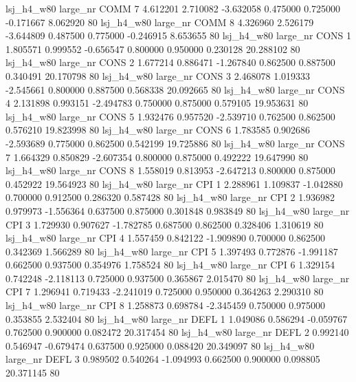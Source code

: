   lsj_h4_w80   large_nr     COMM                 7  4.612201  2.710082  -3.632058 0.475000 0.725000 -0.171667    8.062920 80
  lsj_h4_w80   large_nr     COMM                 8  4.326960  2.526179  -3.644809 0.487500 0.775000 -0.246915    8.653655 80
  lsj_h4_w80   large_nr     CONS                 1  1.805571  0.999552  -0.656547 0.800000 0.950000  0.230128   20.288102 80
  lsj_h4_w80   large_nr     CONS                 2  1.677214  0.886471  -1.267840 0.862500 0.887500  0.340491   20.170798 80
  lsj_h4_w80   large_nr     CONS                 3  2.468078  1.019333  -2.545661 0.800000 0.887500  0.568338   20.092665 80
  lsj_h4_w80   large_nr     CONS                 4  2.131898  0.993151  -2.494783 0.750000 0.875000  0.579105   19.953631 80
  lsj_h4_w80   large_nr     CONS                 5  1.932476  0.957520  -2.539710 0.762500 0.862500  0.576210   19.823998 80
  lsj_h4_w80   large_nr     CONS                 6  1.783585  0.902686  -2.593689 0.775000 0.862500  0.542199   19.725886 80
  lsj_h4_w80   large_nr     CONS                 7  1.664329  0.850829  -2.607354 0.800000 0.875000  0.492222   19.647990 80
  lsj_h4_w80   large_nr     CONS                 8  1.558019  0.813953  -2.647213 0.800000 0.875000  0.452922   19.564923 80
  lsj_h4_w80   large_nr      CPI                 1  2.288961  1.109837  -1.042880 0.700000 0.912500  0.286320    0.587428 80
  lsj_h4_w80   large_nr      CPI                 2  1.936982  0.979973  -1.556364 0.637500 0.875000  0.301848    0.983849 80
  lsj_h4_w80   large_nr      CPI                 3  1.729930  0.907627  -1.782785 0.687500 0.862500  0.328406    1.310619 80
  lsj_h4_w80   large_nr      CPI                 4  1.557459  0.842122  -1.909890 0.700000 0.862500  0.342369    1.566289 80
  lsj_h4_w80   large_nr      CPI                 5  1.397493  0.772876  -1.991187 0.662500 0.937500  0.354976    1.758524 80
  lsj_h4_w80   large_nr      CPI                 6  1.329154  0.742248  -2.118113 0.725000 0.937500  0.365867    2.015470 80
  lsj_h4_w80   large_nr      CPI                 7  1.296941  0.719433  -2.241019 0.725000 0.950000  0.364263    2.290310 80
  lsj_h4_w80   large_nr      CPI                 8  1.258873  0.698784  -2.345459 0.750000 0.975000  0.353855    2.532404 80
  lsj_h4_w80   large_nr     DEFL                 1  1.049086  0.586294  -0.059767 0.762500 0.900000  0.082472   20.317454 80
  lsj_h4_w80   large_nr     DEFL                 2  0.992140  0.546947  -0.679474 0.637500 0.925000  0.088420   20.349097 80
  lsj_h4_w80   large_nr     DEFL                 3  0.989502  0.540264  -1.094993 0.662500 0.900000  0.098805   20.371145 80
